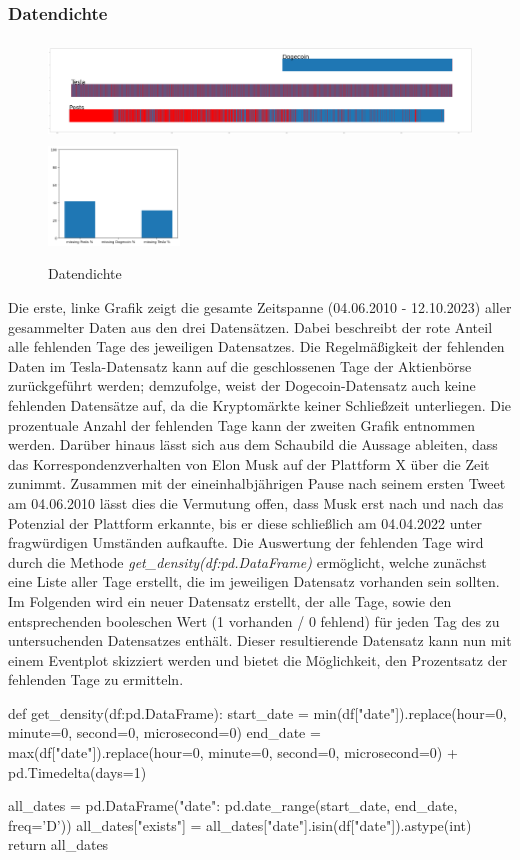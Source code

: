 \documentclass{article}
\begin{document}
\subsubsection{Datendichte} \label{Datendichte}
\begin{figure}[!htb]
  	\includegraphics[width=.7\textwidth, height=100px]{../imgs/Dichte1.png}
	\includegraphics[width=.3\textwidth, height=100px]{../imgs/Dichte2.png}
 	\caption{Datendichte}
 	\label{fig:Datendichte}
\end{figure}
Die erste, linke Grafik zeigt die gesamte Zeitspanne (04.06.2010 - 12.10.2023) aller gesammelter Daten aus den drei Datensätzen.
Dabei beschreibt der rote Anteil alle fehlenden Tage des jeweiligen Datensatzes.
Die Regelmäßigkeit der fehlenden Daten im Tesla-Datensatz kann auf die geschlossenen Tage der Aktienbörse zurückgeführt werden;
demzufolge, weist der Dogecoin-Datensatz auch keine fehlenden Datensätze auf, da die Kryptomärkte keiner Schließzeit unterliegen.
Die prozentuale Anzahl der fehlenden Tage kann der zweiten Grafik entnommen werden.
Darüber hinaus lässt sich aus dem Schaubild die Aussage ableiten, dass das Korrespondenzverhalten von Elon Musk auf der Plattform X über die Zeit zunimmt.
Zusammen mit der eineinhalbjährigen Pause nach seinem ersten Tweet am 04.06.2010 lässt dies die Vermutung offen, dass Musk erst nach und nach das Potenzial der Plattform erkannte, bis er diese schließlich am 04.04.2022 unter fragwürdigen Umständen aufkaufte. 
Die Auswertung der fehlenden Tage wird durch die Methode \textit{get\_density(df:pd.DataFrame)} ermöglicht, welche zunächst eine Liste aller Tage erstellt, die im jeweiligen Datensatz vorhanden sein sollten.
Im Folgenden wird ein neuer Datensatz erstellt, der alle Tage, sowie den entsprechenden booleschen Wert (1 vorhanden / 0 fehlend) für jeden Tag des zu untersuchenden Datensatzes enthält.
Dieser resultierende Datensatz kann nun mit einem Eventplot skizziert werden und bietet die Möglichkeit, den Prozentsatz der fehlenden Tage zu ermitteln.
\begin{python}
def get_density(df:pd.DataFrame):
    start_date = min(df["date"]).replace(hour=0, minute=0, second=0, microsecond=0)
    end_date = max(df["date"]).replace(hour=0, minute=0, second=0, microsecond=0) + pd.Timedelta(days=1)

    all_dates = pd.DataFrame({"date": pd.date_range(start_date, end_date, freq='D')})
    all_dates["exists"] = all_dates["date"].isin(df["date"]).astype(int)
    return all_dates
\end{python}
\end{document}
